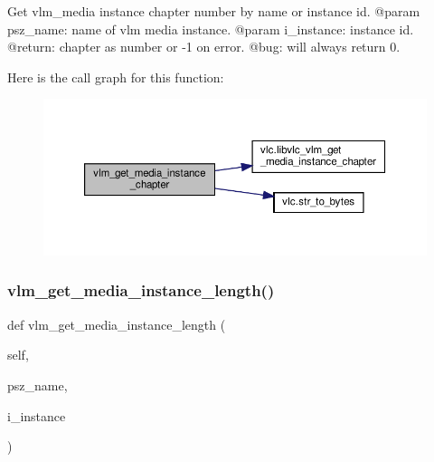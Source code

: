 \begin{DoxyVerb}Get vlm_media instance chapter number by name or instance id.
@param psz_name: name of vlm media instance.
@param i_instance: instance id.
@return: chapter as number or -1 on error.
@bug: will always return 0.
\end{DoxyVerb}
 Here is the call graph for this function\+:
\nopagebreak
\begin{figure}[H]
\begin{center}
\leavevmode
\includegraphics[width=350pt]{classvlc_1_1_instance_ae060ff32b135cd2bf8990ad5fafc6143_cgraph}
\end{center}
\end{figure}
\mbox{\label{classvlc_1_1_instance_afdfbfb3da424196fb3ada02d3af20c34}} 
\subsubsection{\texorpdfstring{vlm\+\_\+get\+\_\+media\+\_\+instance\+\_\+length()}{vlm\_get\_media\_instance\_length()}}
{\footnotesize\ttfamily def vlm\+\_\+get\+\_\+media\+\_\+instance\+\_\+length (\begin{DoxyParamCaption}\item[{}]{self,  }\item[{}]{psz\+\_\+name,  }\item[{}]{i\+\_\+instance }\end{DoxyParamCaption})}


